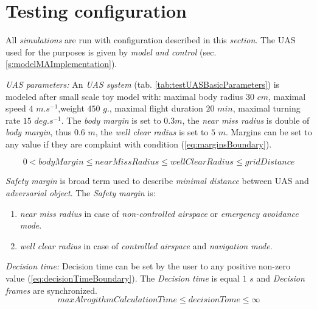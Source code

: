 \section{Testing configuration}\label{sec:testingConfiguration}

    \noindent All \emph{simulations} are run with configuration described in this \emph{section}. The UAS used for the purposes is given by \emph{model and control} (sec. \ref{s:modelMAImplementation}). 
    
    \emph{UAS parameters:} An \emph{UAS system} (tab. \ref{tab:testUASBasicParameters}) is modeled after small scale toy model with: maximal body radius $30$ $cm$, maximal speed $4$ $m.s^{-1}$,weight $450$ $g$., maximal flight duration $20$ $min$, maximal turning rate $15$ $deg.s^{-1}$. The \emph{body margin} is set to $0.3 m$, the \emph{near miss radius} is double of \emph{body margin}, thus $0.6$ $m$, the \emph{well clear radius} is set to $5$ $m$. Margins can be set to any value if they are complaint with condition (\ref{eq:marginsBoundary}).
    
    \begin{equation}\label{eq:marginsBoundary}
        0 < bodyMargin \le nearMissRadius \le wellClearRadius \le gridDistance
    \end{equation}   
    
    \begin{note}
        \emph{Safety margin} is broad term used to describe \emph{minimal distance} between UAS and \emph{adversarial object}. The \emph{Safety margin} is:
        \begin{enumerate}
            \item \emph{near miss radius} in case of \emph{non-controlled airspace} or \emph{emergency avoidance mode}.
            \item \emph{well clear radius} in case of \emph{controlled airspace} and \emph{navigation mode}.
        \end{enumerate}
    \end{note}
    
    \emph{Decision time:} Decision time can be set by the user to any positive non-zero value (\ref{eq:decisionTimeBoundary}). The \emph{Decision time} is equal $1$ $s$ and \emph{Decision frames} are synchronized.
    \begin{equation}\label{eq:decisionTimeBoundary}
        maxAlrogithmCalculationTime \le decisionTome \le \infty
    \end{equation}
    
